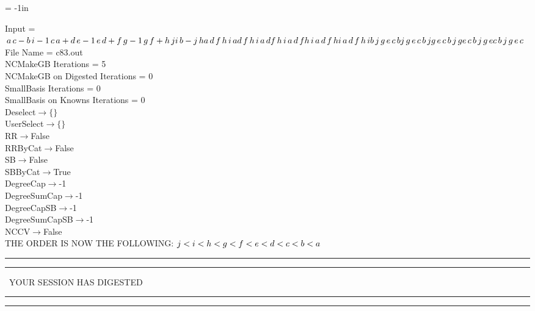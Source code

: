 \voffset = -1in
\evensidemargin 0.1in
\oddsidemargin 0.1in
\textheight 9in
\textwidth 6in

\normalsize
\baselineskip=12pt
\noindent
Input = 
$
\\a\,
 c - b\,
 i\\
-1\,
 c\,
 a + d\,
 e\\
-1\,
 e\,
 d + f\,
 g\\
-1\,
 g\,
 f + h\,
 j\\
i\,
 b - j\,
 h\\
a\,
 d\,
 f\,
 h\,
 i\,
 a\\
d\,
 f\,
 h\,
 i\,
 a\,
 d\\
f\,
 h\,
 i\,
 a\,
 d\,
 f\\
h\,
 i\,
 a\,
 d\,
 f\,
 h\\
i\,
 a\,
 d\,
 f\,
 h\,
 i\\
b\,
 j\,
 g\,
 e\,
 c\,
 b\\
j\,
 g\,
 e\,
 c\,
 b\,
 j\\
g\,
 e\,
 c\,
 b\,
 j\,
 g\\
e\,
 c\,
 b\,
 j\,
 g\,
 e\\
c\,
 b\,
 j\,
 g\,
 e\,
 c\\
$
File Name = c83.out\\
NCMakeGB Iterations = 5\\
NCMakeGB on Digested Iterations = 0\\
SmallBasis Iterations = 0\\
SmallBasis on Knowns Iterations = 0\\
Deselect$\rightarrow \{\}$\\
UserSelect$\rightarrow \{\}$\\
RR$\rightarrow $False\\
RRByCat$\rightarrow $False\\
SB$\rightarrow $False\\
SBByCat$\rightarrow $True\\
DegreeCap$\rightarrow $-1\\
DegreeSumCap$\rightarrow $-1\\
DegreeCapSB$\rightarrow $-1\\
DegreeSumCapSB$\rightarrow $-1\\
NCCV$\rightarrow $False\\
THE ORDER IS NOW THE FOLLOWING:\hfil\break
$
j<i<h<g<f<e<d<c<b<a\\
$
\rule[2pt]{6in}{4pt}\hfil\break
\rule[2pt]{1.879in}{4pt}
\ YOUR SESSION HAS DIGESTED\ 
\rule[2pt]{1.879in}{4pt}\hfil\break
\rule[2pt]{1.923in}{4pt}
